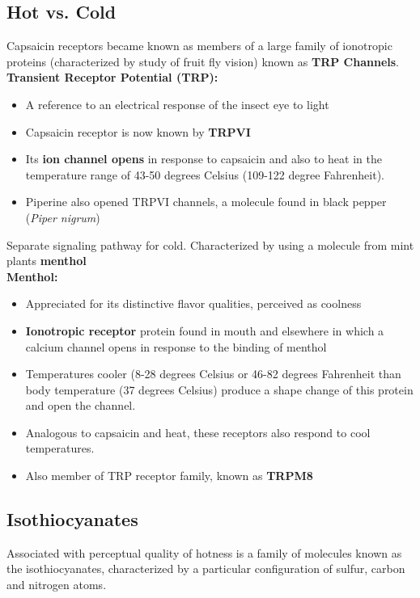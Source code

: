 \documentclass{article}
\begin{document}
\subsection{Hot vs. Cold}

Capsaicin receptors became known as members of a large family of ionotropic proteins (characterized by study of fruit fly vision) known as \textbf{TRP Channels}. \\

\textbf{Transient Receptor Potential (TRP):}
\begin{itemize}
    \item A reference to an electrical response of the insect eye to light
    \item Capsaicin receptor is now known by \textbf{TRPVI}
    \item Its \textbf{ion channel opens} in response to capsaicin and also to heat in the temperature range of 43-50 degrees Celsius (109-122 degree Fahrenheit). 
    \item Piperine also opened TRPVI channels, a molecule found in black pepper (\textit{Piper nigrum})
\end{itemize}

Separate signaling pathway for cold. Characterized by using a molecule from mint plants \textbf{menthol} \\

\textbf{Menthol:}
\begin{itemize}
    \item Appreciated for its distinctive flavor qualities, perceived as coolness
    \item \textbf{Ionotropic receptor} protein found in mouth and elsewhere in which a calcium channel opens in response to the binding of menthol
    \item Temperatures cooler (8-28 degrees Celsius or 46-82 degrees Fahrenheit than body temperature (37 degrees Celsius) produce a shape change of this protein and open the channel. 
    \item Analogous to capsaicin and heat, these receptors also respond to cool temperatures.
    \item Also member of TRP receptor family, known as \textbf{TRPM8}
\end{itemize}

\subsection{Isothiocyanates}

Associated with perceptual quality of hotness is a family of molecules known as the isothiocyanates, characterized by a particular configuration of sulfur, carbon and nitrogen atoms.
\end{document}
